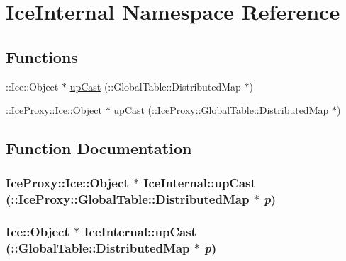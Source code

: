 \hypertarget{namespace_ice_internal}{
\section{IceInternal Namespace Reference}
\label{namespace_ice_internal}
}
\subsection*{Functions}
\begin{DoxyCompactItemize}
\item 
::Ice::Object $\ast$ \hyperlink{namespace_ice_internal_a4fa8366e239bf3c21ea84a7b5dd56623}{upCast} (::GlobalTable::DistributedMap $\ast$)
\item 
::IceProxy::Ice::Object $\ast$ \hyperlink{namespace_ice_internal_a68c4036c4301612ec4bd788645839438}{upCast} (::IceProxy::GlobalTable::DistributedMap $\ast$)
\end{DoxyCompactItemize}


\subsection{Function Documentation}
\hypertarget{namespace_ice_internal_a68c4036c4301612ec4bd788645839438}{
\subsubsection[{upCast}]{\setlength{\rightskip}{0pt plus 5cm}IceProxy::Ice::Object $\ast$ IceInternal::upCast (::IceProxy::GlobalTable::DistributedMap $\ast$ {\em p})}}
\label{namespace_ice_internal_a68c4036c4301612ec4bd788645839438}
\hypertarget{namespace_ice_internal_a4fa8366e239bf3c21ea84a7b5dd56623}{
\subsubsection[{upCast}]{\setlength{\rightskip}{0pt plus 5cm}Ice::Object $\ast$ IceInternal::upCast (::GlobalTable::DistributedMap $\ast$ {\em p})}}
\label{namespace_ice_internal_a4fa8366e239bf3c21ea84a7b5dd56623}
